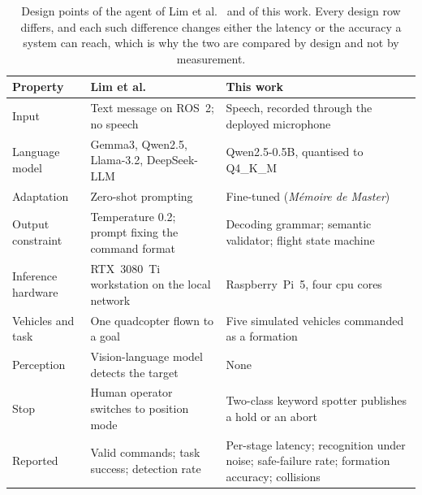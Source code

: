 \begin{table}[htbp]
\centering
\footnotesize
\caption[Design points of Lim et al.\ and of this work]{Design points of the agent of Lim et
al.~\cite{lim2025} and of this work. Every design row differs, and each such difference changes either
the latency or the accuracy a system can reach, which is why the two are compared by design and not by
measurement.}
\label{tab:lim-positioning}
\begin{tabularx}{\textwidth}{@{}>{\raggedright\arraybackslash}p{2.6cm} >{\raggedright\arraybackslash}X >{\raggedright\arraybackslash}X@{}}
\toprule
Property & Lim et al. & This work \\
\midrule
Input & Text message on ROS~2; no speech & Speech, recorded through the deployed microphone \\
Language model & Gemma3, Qwen2.5, Llama-3.2, DeepSeek-LLM & Qwen2.5-0.5B, quantised to Q4\_K\_M \\
Adaptation & Zero-shot prompting & Fine-tuned (\emph{M\'emoire de Master}) \\
Output constraint & Temperature 0.2; prompt fixing the command format & Decoding grammar; semantic validator; flight state machine \\
Inference hardware & RTX~3080~Ti workstation on the local network & Raspberry~Pi~5, four \gls{cpu} cores \\
Vehicles and task & One quadcopter flown to a goal & Five simulated vehicles commanded as a formation \\
Perception & Vision-language model detects the target & None \\
Stop & Human operator switches to position mode & Two-class keyword spotter publishes a hold or an abort \\
Reported & Valid commands; task success; detection rate & Per-stage latency; recognition under noise; safe-failure rate; formation accuracy; collisions \\
\bottomrule
\end{tabularx}
\end{table}

